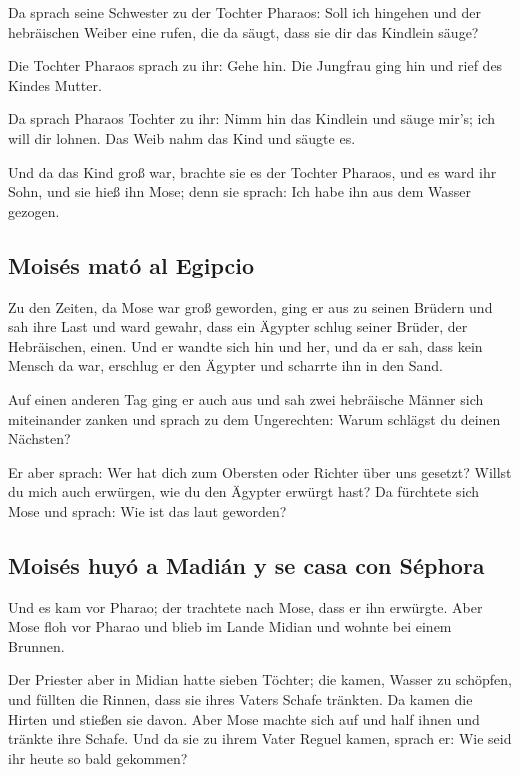  Da sprach seine Schwester zu der Tochter Pharaos: Soll
ich hingehen und der hebräischen Weiber eine rufen, die da säugt, dass
sie dir das Kindlein säuge?

 Die Tochter Pharaos sprach zu ihr: Gehe hin. Die Jungfrau
ging hin und rief des Kindes Mutter.

 Da sprach Pharaos Tochter zu ihr: Nimm hin das Kindlein
und säuge mir's; ich will dir lohnen. Das Weib nahm das Kind und säugte
es.

 Und da das Kind groß war, brachte sie es der Tochter
Pharaos, und es ward ihr Sohn, und sie hieß ihn Mose; denn sie sprach:
Ich habe ihn aus dem Wasser gezogen.

\hypertarget{moisuxe9s-matuxf3-al-egipcio}{%
\subsection{Moisés mató al Egipcio}\label{moisuxe9s-matuxf3-al-egipcio}}

 Zu den Zeiten, da Mose war groß geworden, ging er aus zu
seinen Brüdern und sah ihre Last und ward gewahr, dass ein Ägypter
schlug seiner Brüder, der Hebräischen, einen.  Und er
wandte sich hin und her, und da er sah, dass kein Mensch da war,
erschlug er den Ägypter und scharrte ihn in den Sand.

 Auf einen anderen Tag ging er auch aus und sah zwei
hebräische Männer sich miteinander zanken und sprach zu dem Ungerechten:
Warum schlägst du deinen Nächsten?

 Er aber sprach: Wer hat dich zum Obersten oder Richter
über uns gesetzt? Willst du mich auch erwürgen, wie du den Ägypter
erwürgt hast? Da fürchtete sich Mose und sprach: Wie ist das laut
geworden?

\hypertarget{moisuxe9s-huyuxf3-a-madiuxe1n-y-se-casa-con-suxe9phora}{%
\subsection{Moisés huyó a Madián y se casa con
Séphora}\label{moisuxe9s-huyuxf3-a-madiuxe1n-y-se-casa-con-suxe9phora}}

 Und es kam vor Pharao; der trachtete nach Mose, dass er
ihn erwürgte. Aber Mose floh vor Pharao und blieb im Lande Midian und
wohnte bei einem Brunnen.

 Der Priester aber in Midian hatte sieben Töchter; die
kamen, Wasser zu schöpfen, und füllten die Rinnen, dass sie ihres Vaters
Schafe tränkten.  Da kamen die Hirten und stießen sie
davon. Aber Mose machte sich auf und half ihnen und tränkte ihre Schafe.
 Und da sie zu ihrem Vater Reguel kamen, sprach er: Wie
seid ihr heute so bald gekommen?

